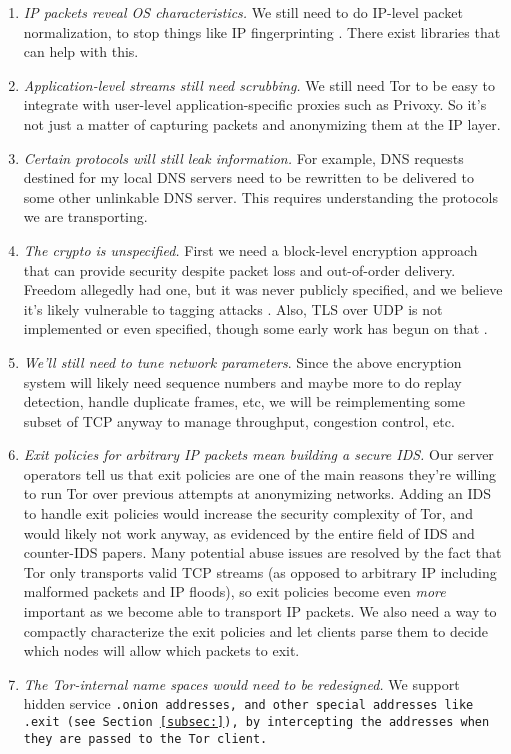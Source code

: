 \documentclass{llncs}
\begin{document}
\begin{enumerate}
\setlength{\itemsep}{0mm}
\setlength{\parsep}{0mm}
\item \emph{IP packets reveal OS characteristics.} We still need to do
IP-level packet normalization, to stop things like IP fingerprinting
\cite{ip-fingerprinting}. There exist libraries \cite{ip-normalizing}
that can help with this.
\item \emph{Application-level streams still need scrubbing.} We still need
Tor to be easy to integrate with user-level application-specific proxies
such as Privoxy. So it's not just a matter of capturing packets and
anonymizing them at the IP layer.
\item \emph{Certain protocols will still leak information.} For example,
DNS requests destined for my local DNS servers need to be rewritten
to be delivered to some other unlinkable DNS server. This requires
understanding the protocols we are transporting.
\item \emph{The crypto is unspecified.} First we need a block-level encryption
approach that can provide security despite
packet loss and out-of-order delivery. Freedom allegedly had one, but it was
never publicly specified, and we believe it's likely vulnerable to tagging
attacks \cite{tor-design}. Also, TLS over UDP is not implemented or even
specified, though some early work has begun on that \cite{ben-tls-udp}.
\item \emph{We'll still need to tune network parameters}. Since the above
encryption system will likely need sequence numbers and maybe more to do
replay detection, handle duplicate frames, etc, we will be reimplementing
some subset of TCP anyway to manage throughput, congestion control, etc.
\item \emph{Exit policies for arbitrary IP packets mean building a secure
IDS.}  Our server operators tell us that exit policies are one of
the main reasons they're willing to run Tor over previous attempts
at anonymizing networks.  Adding an IDS to handle exit policies would
increase the security complexity of Tor, and would likely not work anyway,
as evidenced by the entire field of IDS and counter-IDS papers. Many
potential abuse issues are resolved by the fact that Tor only transports
valid TCP streams (as opposed to arbitrary IP including malformed packets
and IP floods), so exit policies become even \emph{more} important as
we become able to transport IP packets. We also need a way to compactly
characterize the exit policies and let clients parse them to decide
which nodes will allow which packets to exit.
\item \emph{The Tor-internal name spaces would need to be redesigned.} We
support hidden service \tt{.onion} addresses, and other special addresses
like \tt{.exit} (see Section \ref{subsec:}), by intercepting the addresses
when they are passed to the Tor client.
\end{enumerate}
\end{document}

